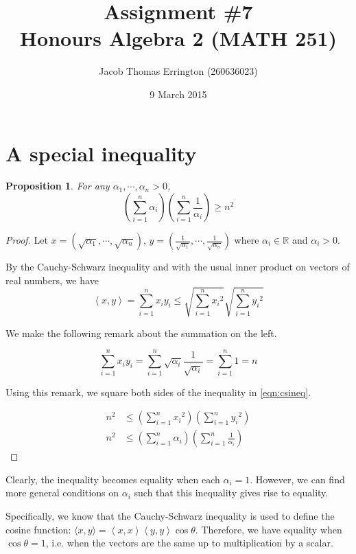 \documentclass{article}
\author{Jacob Thomas Errington (260636023)}
\title{Assignment \#7\\Honours Algebra 2 (MATH 251)}
\date{9 March 2015}
\newtheorem{proposition}{Proposition}
\newcommand{\R}{\mathbb{R}}
\newcommand{\norm}[1]{\left\langle #1, #1 \right\rangle}
\begin{document}
\section{A special inequality}

\begin{proposition}
    For any $\alpha_1, \cdots, \alpha_n > 0$,
    $$\left( \sum_{i=1}^n \alpha_i \right) \left( \sum_{i=1}^n \frac{1}{\alpha_i} \right) \geq n^2$$
\end{proposition}

\begin{proof}
    Let
    $x = (\sqrt{\alpha_1}, \cdots, \sqrt{\alpha_n})$,
    $y = (\frac{1}{\sqrt{\alpha_1}}, \cdots, \frac{1}{\sqrt{\alpha_n}})$
    where $\alpha_i \in \R$ and $\alpha_i > 0$.

    By the Cauchy-Schwarz inequality and with the usual inner product on
    vectors of real numbers, we have
    \begin{equation}
    \left\langle x, y \right\rangle = \sum_{i=1}^n { x_i y_i }
    \leq \sqrt{\sum_{i=1}^n {x_i}^2} \sqrt{\sum_{i=1}^n {y_i}^2}
    \label{eqn:csineq}
    \end{equation}

    We make the following remark about the summation on the left.

    $$\sum_{i=1}^n {x_i y_i}
    = \sum_{i=1}^n {\sqrt{\alpha_i} \frac{1}{\sqrt{\alpha_i}}}
    = \sum_{i=1}^n 1
    = n$$

    Using this remark, we square both sides of the inequality in
    \eqref{eqn:csineq}.

    \begin{align*}
        n^2 &\leq \left( \sum_{i=1}^n {x_i}^2\right) \left(\sum_{i=1}^n {y_i}^2 \right) \\
        n^2 &\leq \left( \sum_{i=1}^n \alpha_i \right) \left( \sum_{i=1}^n \frac{1}{\alpha_i} \right)
    \end{align*}
\end{proof}

Clearly, the inequality becomes equality when each $\alpha_i = 1$.
However, we can find more general conditions on $\alpha_i$ such that this
inequality gives rise to equality.

Specifically, we know that the Cauchy-Schwarz inequality is used to define the
cosine function: $\langle x, y \rangle = \norm{x} \norm{y} \cos{\theta}$.
Therefore, we have equality when $\cos{\theta} = 1$, i.e. when the vectors are
the same up to multiplication by a scalar.
\end{document}
